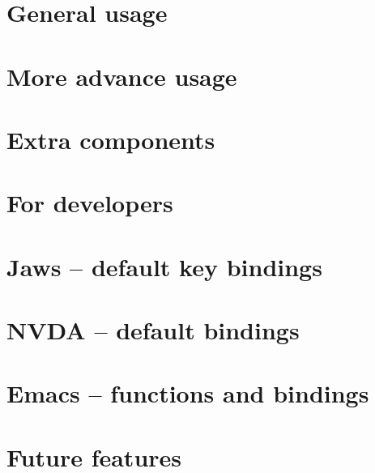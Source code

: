 \documentclass[12pt,a4paper]{report}
\begin{document}
\chapter{General usage}
\label{ch-general-usage}
\chapter{More advance usage}
\label{ch-more-advanced-usage}
\chapter{Extra components}
\label{ch-extra-components}
\chapter{For developers}
\label{ch-for-developers}

\appendix
\chapter{Jaws -- default key bindings}
\label{ap-jaws}
\chapter{NVDA -- default bindings}
\label{ap-nvda}
\chapter{Emacs -- functions and bindings}
\label{AP-emacs}
\chapter{Future features}
\label{AP-future}
\end{document}

